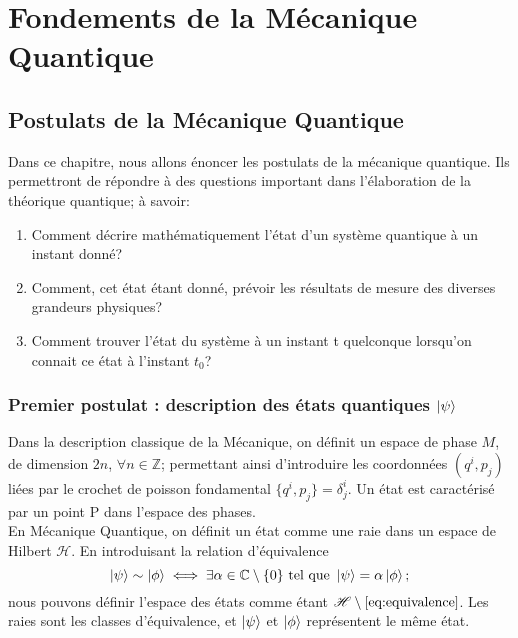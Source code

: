 \documentclass[../notesdecours.tex]{subfiles}
\begin{document}
    \part{Fondements de la Mécanique Quantique}

    \chapter{Postulats de la Mécanique Quantique}

    Dans ce chapitre, nous allons énoncer les postulats de la mécanique quantique. Ils permettront de répondre à des questions important dans l'élaboration de la théorique quantique; à savoir:
    \begin{enumerate}
    \item Comment décrire mathématiquement l'état d'un système quantique à un instant donné?
    \item Comment, cet état étant donné, prévoir les résultats de mesure des diverses grandeurs physiques?
    \item Comment trouver l'état du système à un instant t quelconque lorsqu'on connait  ce état à l'instant $t_0$?
    \end{enumerate}

    \section{Premier postulat : description des états quantiques $\ket{\psi}$}

    Dans la description classique de la Mécanique, on définit un espace de phase $M$, de dimension $2n$, $\forall n\in\mathbb{Z}$; permettant ainsi d'introduire les coordonnées $\left(q^i,p_j\right)$ liées par le crochet de poisson fondamental $\{q^i,p_j\}=\delta^i_j$. Un état est caractérisé par un point P dans l'espace des phases.\\

    En Mécanique Quantique, on définit un état comme une raie dans un espace de Hilbert $\mathcal{H}$. En introduisant la relation d'équivalence
    \begin{equation}
    \label{eq:equivalence}
        \ket{\psi} \sim \ket{\phi} \iff \exists \alpha\in\mathbb{C}\setminus\{0\} \text{ tel que } \ket{\psi}=\alpha\ket{\phi} ;
    \end{equation}
    nous pouvons définir l'espace des états comme étant $\mathcal{H}\setminus\ref{eq:equivalence}$. Les raies sont les classes d'équivalence, et $\ket{\psi}$ et $\ket{\phi}$ représentent le même état.\\
\end{document}
